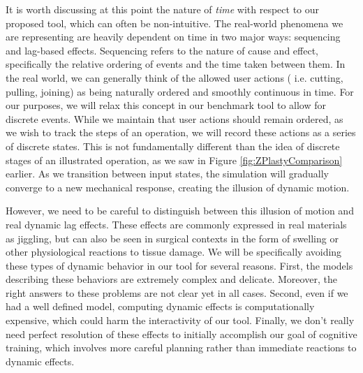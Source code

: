 It is worth discussing at this point the nature of \textit{time} with respect
to our proposed tool, which can often be non-intuitive. The real-world
phenomena we are representing are heavily dependent on time in two
major ways: sequencing and lag-based effects. Sequencing refers to the
nature of cause and effect, specifically the relative ordering of
events and the time taken between them. In the real world, we can
generally think of the allowed user actions ( i.e. cutting, pulling,
joining) as being naturally ordered and smoothly continuous in
time. For our purposes, we will relax this concept in our benchmark
tool to allow for discrete events. While we maintain that user actions
should remain ordered, as we wish to track the steps of an operation,
we will record these actions as a series of discrete states. This is
not fundamentally different than the idea of discrete stages of an
illustrated operation, as we saw in Figure \ref{fig:ZPlastyComparison}
earlier. As we transition between input states, the simulation will
gradually converge to a new mechanical response, creating the illusion
of dynamic motion.

However, we need to be careful to distinguish between this illusion of
motion and real dynamic lag effects. These effects are commonly
expressed in real materials as jiggling, but can also be seen in
surgical contexts in the form of swelling or other physiological
reactions to tissue damage. We will be specifically avoiding these
types of dynamic behavior in our tool for several reasons. First, the
models describing these behaviors are extremely complex and
delicate. Moreover, the right answers to these problems are not clear
yet in all cases. Second, even if we had a well defined model,
computing dynamic effects is computationally expensive, which could
harm the interactivity of our tool. Finally, we don't really need
perfect resolution of these effects to initially accomplish our goal of
cognitive training, which involves more careful planning rather than
immediate reactions to dynamic effects. 






